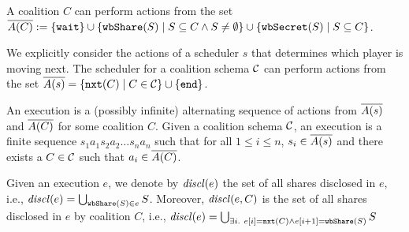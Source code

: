 %
A coalition $C$ can perform actions from the set $\overline{A(C)} := \{\mathtt{wait}\} \cup \{ \mathtt{wbShare}(S) \mid S \subseteq C \wedge S \neq \emptyset\} \cup \{ \mathtt{wbSecret}(S) \mid S \subseteq C\}$.

%
We explicitly consider the actions of a scheduler $s$ that determines which player is moving next.
%
The scheduler for a coalition schema $\mathcal{C}$ can perform actions from the set $\overline{A(s)} = \{\mathtt{nxt}(C) \mid C \in \mathcal{C} \} \cup \{ \mathtt{end} \}$.


%
An execution is a (possibly infinite) alternating sequence of actions from $\overline{A(s)}$ and $\overline{A(C)}$ for some coalition $C$.
%
Given a coalition schema $\mathcal{C}$, an execution is a finite sequence $s_1a_1s_2a_2 \ldots s_na_n$ such that for all $1 \leq i \leq n$, $s_i \in \overline{A(s)}$ and there exists a $C \in \mathcal{C}$ such that $a_i \in \overline{A(C)}$.

Given an execution $e$, we denote by $\mathit{discl}(e)$ the set of all shares disclosed in $e$, i.e., $\mathit{discl}(e) = \bigcup_{\mathtt{wbShare}(S) \in e} S$.
%
Moreover, $\mathit{discl}(e,C)$ is the set of all shares disclosed in $e$ by coalition $C$, i.e., $\disclosed{e} = \bigcup_{ \exists i.\ e[i]=\nxt{C} \wedge e[i+1]=\wShare{S}} S$

